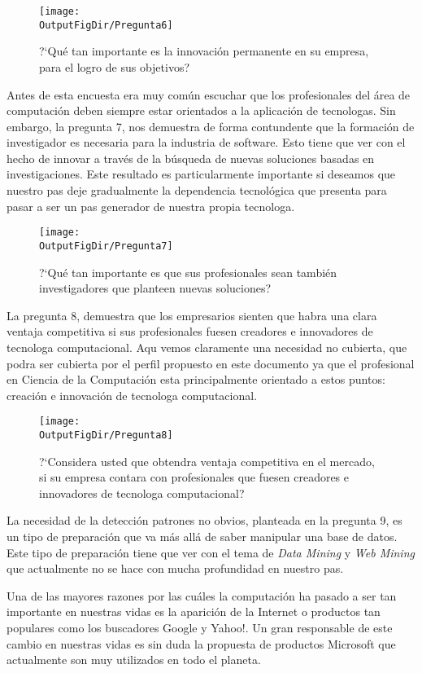\begin{figure}[!h]
	\centering
	\texttt{[image: \\OutputFigDir/Pregunta6]}
	\label{fig:Preg6}
	\caption{?`Qué tan importante es la innovación permanente en su empresa, para el logro de sus objetivos?}
\end{figure}

Antes de esta encuesta era muy común escuchar que los profesionales del área de computación deben siempre estar orientados a la aplicación de tecnolog­as. Sin embargo, la pregunta 7, nos demuestra de forma contundente que la formación de investigador es necesaria para la industria de software. Esto tiene que ver con el hecho de innovar a través de la búsqueda de nuevas soluciones basadas en investigaciones. Este resultado es particularmente importante si deseamos que nuestro pa­s deje gradualmente la dependencia tecnológica que presenta para pasar a ser un pa­s generador de nuestra propia tecnolog­a.

\begin{figure}[!h]
	\centering
	\texttt{[image: \\OutputFigDir/Pregunta7]}
	\label{fig:Preg7}
	\caption{?`Qué tan importante es que sus profesionales sean también investigadores que planteen nuevas soluciones?}
\end{figure}

La pregunta 8, demuestra que los empresarios sienten que habr­a una clara ventaja competitiva si sus profesionales fuesen creadores e innovadores de tecnolog­a computacional. Aqu­ vemos claramente una necesidad no cubierta, que podr­a ser cubierta por el perfil propuesto en este documento ya que el profesional en Ciencia de la Computación esta principalmente orientado a estos puntos: creación e innovación de tecnolog­a computacional.

\begin{figure}[!h]
	\centering
	\texttt{[image: \\OutputFigDir/Pregunta8]}
	\label{fig:Preg8}
	\caption{?`Considera usted que obtendr­a ventaja competitiva en el mercado, si su empresa contara con profesionales que fuesen creadores e innovadores de tecnolog­a computacional?}
\end{figure}

La necesidad de la detección patrones no obvios, planteada en la pregunta 9,  es un tipo de preparación que va más allá de saber manipular una base de datos. Este tipo de preparación tiene que ver con el tema de \textit{Data Mining} y \textit{Web Mining} que actualmente no se hace con mucha profundidad en nuestro pa­s.

Una de las mayores razones por las cuáles la computación ha pasado a ser tan importante en nuestras vidas es la aparición de la Internet o productos tan populares como los buscadores Google y Yahoo!. Un gran responsable de este cambio en nuestras vidas es sin duda la propuesta de productos Microsoft que actualmente son muy utilizados en todo el planeta. 


